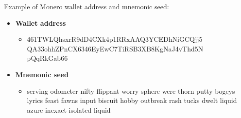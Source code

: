 \documentclass[
  printed, %
  table,   %
  nolof,     %
  nolot,     %
           oneside, color
]{fithesis3}
\begin{document}
Example of Monero wallet address and mnemonic seed:
\begin{itemize}\itemsep0em
\item \textbf{Wallet address}
\begin{itemize}\itemsep0em
\item 461TWLQhsxrR9dD4CXk4p1RRxAAQ3YCEDhNiGCQjj5\\QA33ohhZPnCX6346EyEwC7TiRSB3XB8KgNaJ4vThd5N\\pQqRkGab66
\end{itemize}
\item \textbf{Mnemonic seed}
\begin{itemize}\itemsep0em
\item serving odometer nifty flippant worry sphere were thorn putty bogeys lyrics feast fawns input biscuit hobby outbreak rash tucks dwelt liquid azure inexact isolated liquid
\end{itemize}
\end{itemize}
\end{document}
